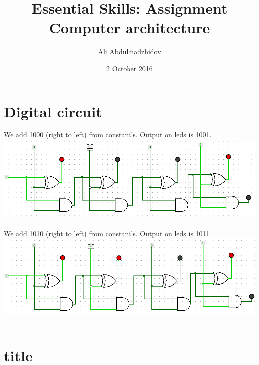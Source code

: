 \documentclass[10pt]{article}
\title{Essential Skills: Assignment Computer architecture}
\date{2 October 2016}
\author{Ali Abdulmadzhidov}
\begin{document}
\renewcommand*\rmdefault{cmss}
\maketitle
\section{Digital circuit}
We add 1000 (right to left) from constant's. Output on leds is 1001.
\includegraphics[width=\textwidth, scale=0.5]{circuit1} \\ \\
We add 1010 (right to left) from constant's. Output on leds is 1011
\includegraphics[width=\textwidth, scale=0.5]{circuit2} \\ \\

\section{title}
\end{document}
